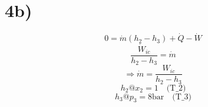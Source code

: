 

\section*{4b)}
\[
0 = \dot{m} (h_2 - h_3) + \dot{Q} - \dot{W}
\]
\[
\frac{\dot{W}_{ic}}{h_2 - h_3} = \dot{m}
\]
\[
\Rightarrow \dot{m} = \frac{W_{ic}}{h_2 - h_3}
\]
\[
h_2 @ x_2 = 1 \quad \text{(T_2)}
\]
\[
h_3 @ p_3 = 8 \text{bar} \quad \text{(T_3)}
\]